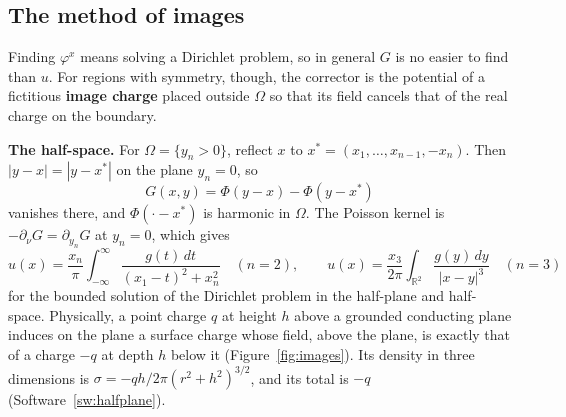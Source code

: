 \documentclass[11pt,a4paper]{article}
\numberwithin{equation}{section}
\theoremstyle{definition}
\begin{document}
\subsection{The method of images}
\label{ssec:images}

Finding $\varphi^x$ means solving a Dirichlet problem, so in general $G$ is no easier to find than $u$. For regions with symmetry, though, the corrector is the potential of a fictitious \textbf{image charge} placed outside $\Omega$ so that its field cancels that of the real charge on the boundary.

\textbf{The half-space.} For $\Omega = \{y_n > 0\}$, reflect $x$ to $x^* = (x_1, \ldots, x_{n - 1}, -x_n)$. Then $|y - x| = |y - x^*|$ on the plane $y_n = 0$, so
\[
G(x, y) = \Phi(y - x) - \Phi(y - x^*)
\]
vanishes there, and $\Phi(\cdot - x^*)$ is harmonic in $\Omega$. The Poisson kernel is $-\partial_{\nu}G = \partial_{y_n}G$ at $y_n = 0$, which gives
\[
u(x) = \frac{x_n}{\pi}\int_{-\infty}^\infty\frac{g(t)\,dt}{(x_1 - t)^2 + x_n^2} \quad (n = 2), \qquad u(x) = \frac{x_3}{2\pi}\int_{\mathbb R^2}\frac{g(y)\,dy}{|x - y|^3} \quad (n = 3)
\]
for the bounded solution of the Dirichlet problem in the half-plane and half-space. Physically, a point charge $q$ at height $h$ above a grounded conducting plane induces on the plane a surface charge whose field, above the plane, is exactly that of a charge $-q$ at depth $h$ below it (Figure~\ref{fig:images}).
Its density in three dimensions is $\sigma = -qh/2\pi(r^2 + h^2)^{3/2}$, and its total is $-q$ (Software~\ref{sw:halfplane}).
\end{document}
